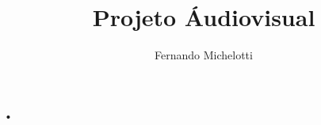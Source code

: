 \documentclass[11pt]{beamer}
\author{Fernando Michelotti}
\title{Projeto Áudiovisual}
\institute{Pinha Cultural}
\begin{document}
\begin{frame}
\titlepage
\end{frame}


\begin{frame}{•}

\end{frame}
\end{document}
